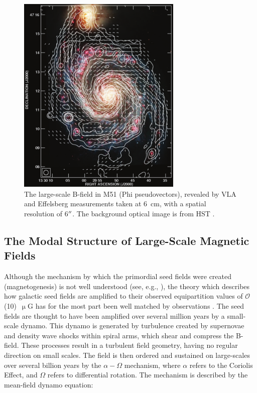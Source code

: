 \begin{figure}[!htbp]
\centering
\includegraphics[width=0.7\textwidth]{figures/galaxies/m51}
\caption[A composite radio image of the large-scale B-field in M51.]{The large-scale B-field in M51 (\gls{Phi} pseudovectors), revealed by VLA and Effelsberg measurements taken at 6~cm, with a spatial resolution of 6$\operatorname{^{\prime\prime}}$. The background optical image is from HST \citep{fletcher2011magnetic}.}
\label{fig:m51}
\end{figure}

\subsection{The Modal Structure of Large-Scale Magnetic Fields}\label{dynamo}

Although the mechanism by which the primordial seed fields were created (magnetogenesis) is not well understood (see, e.g., \citet{kandus2011primordial}), the theory which describes how galactic seed fields are amplified to their observed equipartition values of $\mathcal{O}$(10)~$\upmu$G has for the most part been well matched by observations \citep{beck2006origin}. The seed fields are thought to have been amplified over several million years by a small-scale dynamo. This dynamo is generated by turbulence created by supernovae and density wave shocks within spiral arms, which shear and compress the B-field. These processes result in a turbulent field geometry, having no regular direction on small scales. The field is then ordered and sustained on large-scales over several billion years by the $\alpha-\Omega$ mechanism, where $\alpha$ refers to the Coriolis Effect, and $\Omega$ refers to differential rotation. The mechanism is described by the mean-field dynamo equation:


